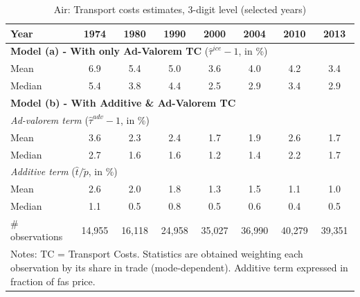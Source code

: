 \documentclass[a4paper,11pt]{article}
\begin{document}
\begin{table}[htbp]
  \caption{Air: Transport costs estimates, 3-digit level (selected years)}
\begin{center}
    \begin{tabular}{l|ccccccc}
\hline\hline
Year & 1974  & 1980  & 1990  & 2000  & 2004 & 2010  & 2013   \\
\hline
\multicolumn{8}{l}{\textbf{Model (a) - With only Ad-Valorem TC} ($\widehat{\tau}^{ice}-1$, in \%)}     \\
\hline
Mean  & 6.9& 5.4 &5.0 & 3.6 & 4.0 & 4.2 & 3.4  \\
Median & 5.4 & 3.8 & 4.4 & 2.5 & 2.9 & 3.4 & 2.9  \\
\hline
\multicolumn{8}{l}{\textbf{Model (b) - With Additive \& Ad-Valorem TC}}    \\
\hline
\multicolumn{8}{l}{\textit{Ad-valorem term} ($\widehat{\tau}^{adv}-1$, in \%)}  \\ \hline
Mean & 3.6 & 2.3 & 2.4 &1.7 & 1.9 & 2.6 & 1.7  \\
Median & 2.7 & 1.6 & 1.6 & 1.2 & 1.4 & 2.2 & 1.7 \\

\hline
\multicolumn{8}{l}{\textit{Additive term} ($\widehat{t}/\widetilde{p}$, in \%)}     \\ \hline
Mean & 2.6 & 2.0 & 1.8 & 1.3 & 1.5 & 1.1 & 1.0  \\
Median & 1.1 & 0.5 & 0.8 & 0.5 & 0.6 & 0.4 & 0.5  \\
\hline
\# observations & 14,955 & 16,118 & 24,958 & 35,027 & 36,990 & 40,279 & 39,351  \\
\hline\hline
\multicolumn{8}{l}{\parbox[l]{15cm}{ \vspace{7pt}\footnotesize{Notes: TC = Transport Costs.
Statistics are obtained weighting each observation by its share in trade (mode-dependent).
Additive term expressed in fraction of fas price.}}}
\end{tabular}%
\end{center}
\label{tab:result_air_3d_detail}
\end{table}%
\end{document}
